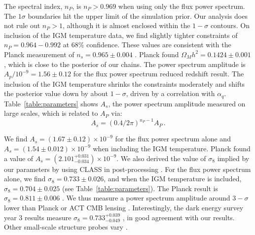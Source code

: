 The spectral index, $n_P$, is $n_P > 0.969$ when using only the flux power spectrum. The $1\sigma$ boundaries hit the upper limit of the simulation prior. Our analysis does not rule out $n_P > 1$, although it is almost enclosed within the $1-\sigma$ contours. On inclusion of the IGM temperature data, we find slightly tighter constraints of $n_P = 0.964 - 0.992$ at 68\% confidence.
These values are consistent with the Planck measurement of $n_s=0.965 \pm 0.004$ \cite{2020A&A...641A...6P}.
Planck found $\Omega_M h^2 = 0.1424\pm0.001$, which is close to the posterior of our chains.
The power spectrum amplitude is $A_p/10^{-9} = 1.56 \pm 0.12$ for the flux power spectrum reduced redshift result.
The inclusion of the IGM temperature shrinks the constraints moderately and shifts the posterior value down by about $1-\sigma$, driven by a correlation with $\alpha_q$.
Table~\ref{table:parameters} shows $A_s$, the power spectrum amplitude measured on large scales, which is related to $A_P$ via:
\begin{equation}
    A_s = \left(0.4/2\pi\right)^{n_P-1} A_P\,.
\end{equation}

We find $A_s = (1.67 \pm 0.12) \times10^{-9}$ for the flux power spectrum alone and $A_s = (1.54 \pm 0.012 )\times10^{-9}$ when including the IGM temperature.
Planck \cite{2020A&A...641A...6P} found a value of $A_s = \left(2.101^{+0.031}_{-0.034}\right)\times10^{-9}$. 
We also derived the value of $\sigma_8$ implied by our parameters by using CLASS in post-processing \cite{2011arXiv1104.2932L}. 
For the flux power spectrum alone, we find $\sigma_8 = 0.733 \pm 0.026$, and when the IGM temperature is included, $\sigma_8 = 0.704 \pm 0.025$ (see Table~\ref{table:parameters}).
The Planck result is $\sigma_8 = 0.811 \pm 0.006$ \cite{2020A&A...641A...6P}.
We thus measure a power spectrum amplitude around $3-\sigma$ lower than Planck or ACT CMB lensing \cite{2023arXiv230405202Q}.
Interestingly, the dark energy survey year 3 results measure $\sigma_8 = 0.733^{+0.039}_{-0.049}$ \cite{2022PhRvD.105b3520A}, in good agreement with our results. Other small-scale structure probes vary \cite[e.g.~][]{2020JCAP...05..042I, 2022JHEAp..34...49A, 2023JCAP...04..057Y}. 

